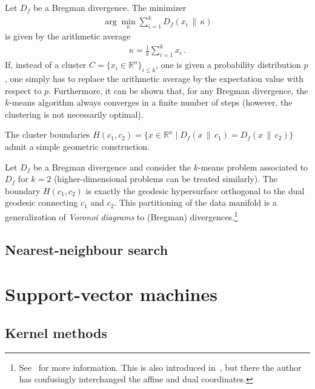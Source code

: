     \begin{property}
        Let $D_f$ be a Bregman divergence. The minimizer
        \begin{gather}
            \arg\min_\kappa\sum_{i=1}^kD_f(x_i\,\|\,\kappa)
        \end{gather}
        is given by the arithmetic average
        \begin{gather}
            \kappa = \frac{1}{k}\sum_{i=1}^kx_i\,.
        \end{gather}
        If, instead of a cluster $C=\{x_i\in\mathbb{R}^n\}_{i\leq k}$, one is given a probability distribution $p$, one simply has to replace the arithmetic average by the expectation value with respect to $p$. Furthermore, it can be shown that, for any Bregman divergence, the $k$-means algorithm always converges in a finite number of steps (however, the clustering is not necessarily optimal).
    \end{property}

    The cluster boundaries $H(c_1, c_2)=\{x\in\mathbb{R}^n\mid D_f(x\,\|\,c_1)=D_f(x\,\|\,c_2)\}$ admit a simple geometric construction.
    \begin{property}
        Let $D_f$ be a Bregman divergence and consider the $k$-means problem associated to $D_f$ for $k=2$ (higher-dimensional problems can be treated similarly). The boundary $H(c_1,c_2)$ is exactly the geodesic hypersurface orthogonal to the dual geodesic connecting $c_1$ and $c_2$. This partitioning of the data manifold is a generalization of \textit{Voronoi diagrams} to (Bregman) divergences.\footnote{See~\citet{boissonnat_bregman_2010} for more information. This is also introduced in~\citet{amari_information_2016}, but there the author has confusingly interchanged the affine and dual coordinates.}
    \end{property}

\subsection{Nearest-neighbour search}


\section{Support-vector machines}
\subsection{Kernel methods}\label{data:kernel_methods}

